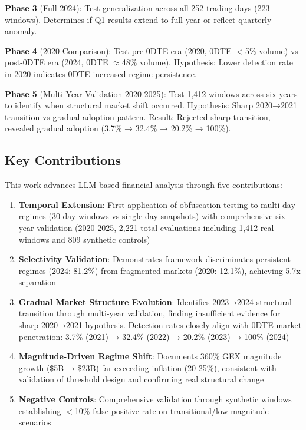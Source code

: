 \textbf{Phase 3} (Full 2024): Test generalization across all 252 trading days (223 windows). Determines if Q1 results extend to full year or reflect quarterly anomaly.

\textbf{Phase 4} (2020 Comparison): Test pre-0DTE era (2020, 0DTE $<$5\% volume) vs post-0DTE era (2024, 0DTE $\approx$48\% volume). Hypothesis: Lower detection rate in 2020 indicates 0DTE increased regime persistence.

\textbf{Phase 5} (Multi-Year Validation 2020-2025): Test 1,412 windows across six years to identify when structural market shift occurred. Hypothesis: Sharp 2020→2021 transition vs gradual adoption pattern. Result: Rejected sharp transition, revealed gradual adoption (3.7\% → 32.4\% → 20.2\% → 100\%).

\subsection{Key Contributions}

This work advances LLM-based financial analysis through five contributions:

\begin{enumerate}
\item \textbf{Temporal Extension}: First application of obfuscation testing to multi-day regimes (30-day windows vs single-day snapshots) with comprehensive six-year validation (2020-2025, 2,221 total evaluations including 1,412 real windows and 809 synthetic controls)
\item \textbf{Selectivity Validation}: Demonstrates framework discriminates persistent regimes (2024: 81.2\%) from fragmented markets (2020: 12.1\%), achieving 5.7x separation
\item \textbf{Gradual Market Structure Evolution}: Identifies 2023→2024 structural transition through multi-year validation, finding insufficient evidence for sharp 2020→2021 hypothesis. Detection rates closely align with 0DTE market penetration: 3.7\% (2021) → 32.4\% (2022) → 20.2\% (2023) → 100\% (2024)
\item \textbf{Magnitude-Driven Regime Shift}: Documents 360\% GEX magnitude growth (\$5B → \$23B) far exceeding inflation (20-25\%), consistent with validation of threshold design and confirming real structural change
\item \textbf{Negative Controls}: Comprehensive validation through synthetic windows establishing $<$10\% false positive rate on transitional/low-magnitude scenarios
\end{enumerate}

